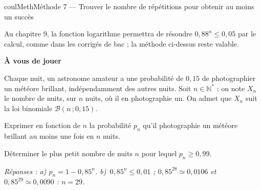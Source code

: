 \documentclass[11pt,a4paper]{article}
\makeatletter
\newcommand{\Ns}{\mathbb{N}^{*}}
\renewcommand{\approx}{\simeq}
\newcounter{lycee@signet}
\newcommand{\signet}[3][]{\stepcounter{lycee@signet}%
  \edef\lycee@dest{\if\relax\detokenize{#1}\relax
    signet.\arabic{lycee@signet}\else#1\fi}%
  \hypertarget{\lycee@dest}{}\bookmark[level=#2,dest=\lycee@dest]{#3}}
\newcounter{methode}
\newenvironment{methodebox}[1][Méthode]{\stepcounter{methode}%
  \begin{boitecours}[phantom={\signet[methode-\arabic{methode}]{2}{#1}}]{coulMeth}{#1}}%
  {\end{boitecours}}
\newcommand{\etape}[1]{\par\smallskip\textbf{\color{coulMeth}#1}\par\nobreak\smallskip}
\newcommand{\reponse}[1]{\par\smallskip
  {\footnotesize\itshape\color{black!55}Réponses : #1}}
\makeatother
\begin{document}
\begin{methodebox}[Méthode 7 --- Trouver le nombre de répétitions pour obtenir au moins un succès]
\begin{remarquebox}
Au chapitre 9, la fonction logarithme permettra de résoudre $0{,}88^{n}\leq 0{,}05$ par
le calcul, comme dans les corrigés de bac ; la méthode ci-dessus reste valable.
\end{remarquebox}

\etape{À vous de jouer}
Chaque nuit, un astronome amateur a une probabilité de $0{,}15$ de photographier un
météore brillant, indépendamment des autres nuits. Soit $n\in\Ns$ ; on note $X_{n}$ le
nombre de nuits, sur $n$ nuits, où il en photographie un. On admet que $X_{n}$ suit la
loi binomiale $\mathcal{B}(n\,;0{,}15)$.
\begin{questions}[label=\alph*)]
  \item Exprimer en fonction de $n$ la probabilité $p_{n}$ qu'il photographie un météore
        brillant au moins une fois en $n$ nuits.
  \item Déterminer le plus petit nombre de nuits $n$ pour lequel $p_{n}\geq 0{,}99$.
\end{questions}
\reponse{a) $p_{n}=1-0{,}85^{n}$.\; b)~$0{,}85^{n}\leq 0{,}01$ ; $0{,}85^{28}\approx 0{,}0106$
et $0{,}85^{29}\approx 0{,}0090$ : $n=29$.}
\end{methodebox}
\end{document}
